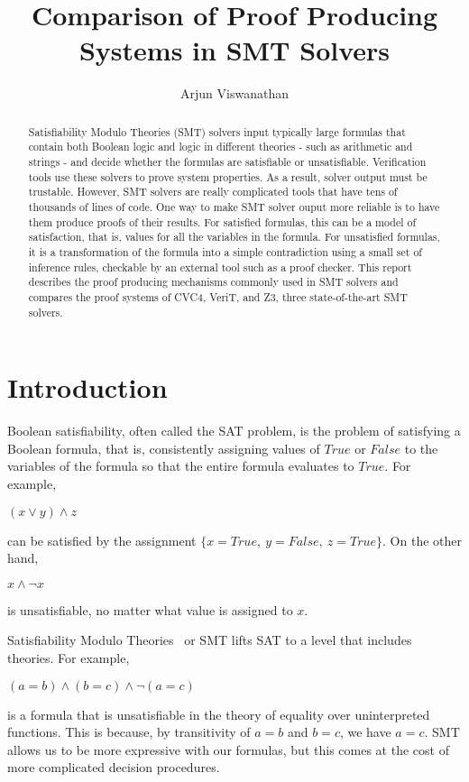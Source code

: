 \documentclass{article}
\begin{document}
\title{Comparison of Proof Producing Systems in SMT Solvers}
\author{Arjun Viswanathan}
\date{}
\maketitle
\begin{abstract}
Satisfiability Modulo Theories (SMT) solvers input typically
large formulas that contain both Boolean logic and logic in 
different theories - such as arithmetic and strings - and 
decide whether 
the formulas are satisfiable or unsatisfiable. Verification 
tools use these solvers to prove system properties. As a 
result, solver output must be trustable. However, SMT solvers 
are really complicated tools that have tens of thousands of 
lines of code. One way to make SMT solver ouput more reliable is 
to have them produce proofs of their results. 
For satisfied formulas, this can be a model of 
satisfaction, that is, values for all the variables in the
formula. For unsatisfied formulas, it is a transformation of 
the formula into a simple contradiction using a small set of 
inference rules, checkable by an external tool such as a proof 
checker. This report describes the proof producing mechanisms 
commonly used in SMT solvers and compares the proof systems 
of CVC4, VeriT, and Z3, three state-of-the-art SMT solvers.
\end{abstract}

\section{Introduction}
\label{sec:intro}
Boolean satisfiability, often called the SAT problem, 
is the problem of satisfying a Boolean formula, that is, 
consistently assigning values of $True$ or $False$ to the variables 
of the formula so that the entire formula evaluates to $True$. 
For example,
\begin{center}$(x \lor y) \land z$ \end{center}
can be satisfied by the 
assignment $\{x=True,\ y=False,\ z=True\}$. On the other hand, 
\begin{center} $x \land \neg x$ \end{center}
is unsatisfiable, no matter what value is assigned to $x$.

Satisfiability Modulo Theories~\cite{DBLP:reference/mc/BarrettT18} 
or SMT lifts SAT to a level that includes theories. 
For example, 
\begin{center} $(a = b) \land (b = c) \land \neg (a = c)$ 
\end{center}
is a formula that is unsatisfiable in the theory of 
equality over uninterpreted functions. This is because, by
transitivity of $a = b$ and $b = c$, we have $a = c$. SMT 
allows us to be more expressive with our formulas, but 
this comes at the cost of more complicated decision 
procedures.
\end{document}
